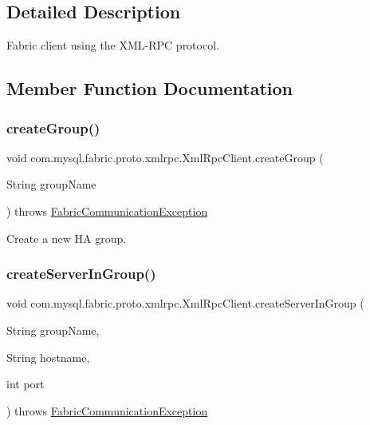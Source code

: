 \subsection{Detailed Description}
Fabric client using the X\+M\+L-\/\+R\+PC protocol. 

\subsection{Member Function Documentation}
\mbox{\label{classcom_1_1mysql_1_1fabric_1_1proto_1_1xmlrpc_1_1_xml_rpc_client_a798e2b72d0dfbe29011320bc85cb7368}} 
\subsubsection{\texorpdfstring{create\+Group()}{createGroup()}}
{\footnotesize\ttfamily void com.\+mysql.\+fabric.\+proto.\+xmlrpc.\+Xml\+Rpc\+Client.\+create\+Group (\begin{DoxyParamCaption}\item[{String}]{group\+Name }\end{DoxyParamCaption}) throws \mbox{\hyperlink{classcom_1_1mysql_1_1fabric_1_1_fabric_communication_exception}{Fabric\+Communication\+Exception}}}

Create a new HA group. \mbox{\label{classcom_1_1mysql_1_1fabric_1_1proto_1_1xmlrpc_1_1_xml_rpc_client_a7fea61d00a4acbbc23aac53f5c108056}} 
\subsubsection{\texorpdfstring{create\+Server\+In\+Group()}{createServerInGroup()}}
{\footnotesize\ttfamily void com.\+mysql.\+fabric.\+proto.\+xmlrpc.\+Xml\+Rpc\+Client.\+create\+Server\+In\+Group (\begin{DoxyParamCaption}\item[{String}]{group\+Name,  }\item[{String}]{hostname,  }\item[{int}]{port }\end{DoxyParamCaption}) throws \mbox{\hyperlink{classcom_1_1mysql_1_1fabric_1_1_fabric_communication_exception}{Fabric\+Communication\+Exception}}}

